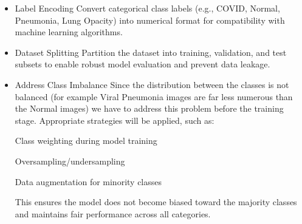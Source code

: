 \documentclass{article}
\begin{document}
\begin{itemize}
\item Label Encoding
Convert categorical class labels (e.g., COVID, Normal, Pneumonia, Lung Opacity) into numerical format for compatibility with machine learning algorithms.
\item Dataset Splitting
Partition the dataset into training, validation, and test subsets to enable robust model evaluation and prevent data leakage.
\item Address Class Imbalance
Since the distribution between the classes is not balanced (for example Viral Pneumonia images are far less numerous than the Normal images) we have to address this problem before the training stage.
Appropriate strategies will be applied, such as:

Class weighting during model training

Oversampling/undersampling

Data augmentation for minority classes

This ensures the model does not become biased toward the majority classes and maintains fair performance across all categories.


\end{itemize}
\end{document}

